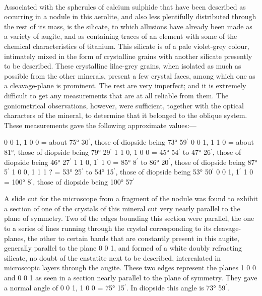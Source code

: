 \documentclass[a4paper, 12pt, oneside]{article}
\begin{document}
\paragraph{}
Associated with the spherules of calcium sulphide that have been described as occurring in a nodule in this aerolite, and also less plentifully distributed through the rest of its mass, is the silicate, to which allusions have already been made as a variety of augite, and as containing traces of an element with some of the chemical characteristics of titanium. This silicate is of a pale violet-grey colour, intimately mixed in the form of crystalline grains with another silicate presently to be described. These crystalline lilac-grey grains, when isolated as much as possible from the other minerals, present a few crystal faces, among which one as a cleavage-plane is prominent. The rest are very imperfect; and it is extremely difficult to get any measurements that are at all reliable from them. The goniometrical observations, however, were sufficient, together with the optical characters of the mineral, to determine that it belonged to the oblique system. These measurements gave the following approximate values:---

0 0 1, 1 0 0 = about 75° 30$^{\prime}$, those of diopside being 73° 59$^{\prime}$  
0 0 1, 1 1 0 = about 81°, those of diopside being 79° 29$^{\prime}$  
1 1 0, 1 0 0 = 45° 54$^{\prime}$ to 47° 26$^{\prime}$, those of diopside being 46° 27$^{\prime}$  
1 1 0, 1$^{\prime}$ 1 0 = 85° 8$^{\prime}$ to 86° 20$^{\prime}$, those of diopside being 87° 5$^{\prime}$  
1 0 0, 1 1 1 ? = 53° 25$^{\prime}$ to 54° 15$^{\prime}$, those of diopside being 53° 50$^{\prime}$  
0 0 1, 1$^{\prime}$ 1 0 = 100° 8$^{\prime}$, those of diopside being 100° 57$^{\prime}$

A slide cut for the microscope from a fragment of the nodule was found to exhibit a section of one of the crystals of this mineral cut very nearly parallel to the plane of symmetry. Two of the edges bounding this section were parallel, the one to a series of lines running through the crystal corresponding to its cleavage-planes, the other to certain bands that are constantly present in this augite, generally parallel to the plane 0 0 1, and formed of a white doubly refracting silicate, no doubt of the enstatite next to be described, intercalated in microscopic layers through the augite. These two edges represent the planes 1 0 0 and 0 0 1 as seen in a section nearly parallel to the plane of symmetry. They gave a normal angle of 0 0 1, 1 0 0 = 75° 15$^{\prime}$. In diopside this angle is 73° 59$^{\prime}$.
\end{document}
